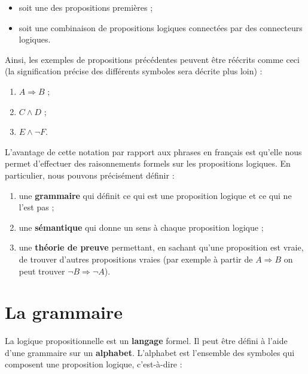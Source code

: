 \begin{itemize}
\item soit une des propositions premières ;
\item soit une combinaison de propositions logiques connectées par des
  connecteurs logiques.
\end{itemize}

Ainsi, les exemples de propositions précédentes peuvent être réécrits
comme ceci (la signification précise des différents symboles sera décrite
plus loin) :

\begin{enumerate}
\item $A \Rightarrow B$ ;
\item $C \land D$ ;
\item $E \land \lnot F$.
\end{enumerate}


L’avantage de cette notation par rapport aux phrases en français est qu’elle
nous permet d’effectuer des raisonnements formels sur les propositions
logiques. En particulier, nous pouvons précisément définir :

\begin{enumerate}
\item une \textbf{grammaire} qui définit ce qui est une proposition logique et ce qui
  ne l’est pas ;
\item une \textbf{sémantique} qui donne un sens à chaque proposition logique ;
\item une \textbf{théorie de preuve} permettant, en sachant qu’une proposition est
  vraie, de trouver d’autres propositions vraies (par exemple à partir de $A
  \Rightarrow B$ on peut trouver $\lnot B \Rightarrow \lnot A$).
\end{enumerate}
\section{La grammaire}

La logique propositionnelle est un \textbf{langage} formel. Il peut être défini
à l’aide d’une grammaire sur un \textbf{alphabet}. L’alphabet est l’ensemble des
symboles qui composent une proposition logique, c’est-à-dire :

